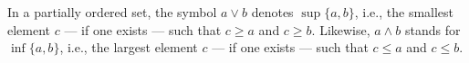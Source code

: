 In a partially ordered set, the symbol $a \vee b$ denotes $\sup \{a, b\}$, i.e., the smallest element $c$ — if one exists — such that $c \geq a$ and $c \geq b$. Likewise, $a \wedge b$ stands for $\inf \{a, b\}$, i.e., the largest element $c$ — if one exists — such that $c \leq a$ and $c \leq b$.
